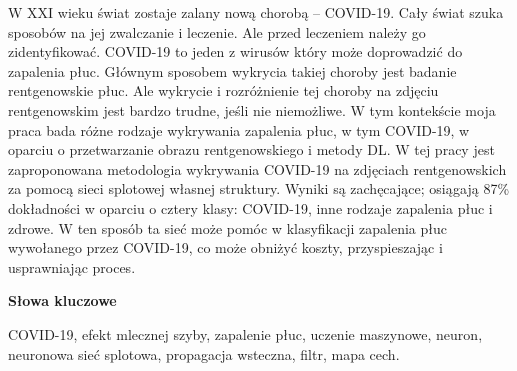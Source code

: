 \documentclass{article}
\begin{document}
W XXI wieku świat zostaje zalany nową chorobą – COVID-19. Cały świat szuka sposobów na jej zwalczanie i leczenie. Ale przed leczeniem należy go zidentyfikować. COVID-19 to jeden z wirusów który może doprowadzić do zapalenia płuc. Głównym sposobem wykrycia takiej choroby jest badanie rentgenowskie płuc. Ale wykrycie i rozróżnienie tej choroby na zdjęciu rentgenowskim jest bardzo trudne, jeśli nie niemożliwe. W tym kontekście moja praca bada różne rodzaje wykrywania zapalenia płuc, w tym COVID-19, w oparciu o przetwarzanie obrazu rentgenowskiego i metody DL. W tej pracy jest zaproponowana metodologia wykrywania COVID-19 na zdjęciach rentgenowskich za pomocą sieci splotowej własnej struktury. Wyniki są zachęcające; osiągają 87\% dokładności w oparciu o cztery klasy: COVID-19, inne rodzaje zapalenia płuc i zdrowe. W ten sposób ta sieć może pomóc w klasyfikacji zapalenia płuc wywołanego przez COVID-19, co może obniżyć koszty, przyspieszając i usprawniając proces.\\

\begin{flushleft}
	\Large
	\textbf{Słowa kluczowe}
\end{flushleft}
COVID-19, efekt mlecznej szyby, zapalenie płuc, uczenie maszynowe, neuron, neuronowa sieć splotowa, propagacja wsteczna, filtr, mapa cech.

\clearpage
\end{document}
